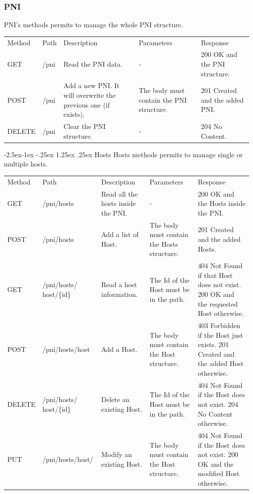 \documentclass[11pt, english]{article}
\makeatletter
\renewcommand\paragraph{\@startsection{paragraph}{4}{\z@}%
            {-2.5ex\@plus -1ex \@minus -.25ex}%
            {1.25ex \@plus .25ex}%
            {\normalfont\normalsize\bfseries}}
\makeatother
\begin{document}
\subsubsection{PNI}
PNI's methods permits to manage the whole PNI structure. \\

\begin{tabular}{ |p{2cm}|m{3cm}|p{3cm}|p{3cm}|p{4cm}| }
    \hline
    \rowcolor{black} \multicolumn{5}{|c|}{\textcolor{white}{PNI}} \\
    \hline
    \rowcolor{Gray}
    Method & Path & Description & Parameters & Response \\
    \hline
    GET   & /pni & Read the PNI data. & - & 200 OK and the PNI structure. \\
    \hline
    POST & /pni & Add a new PNI. It will overwrite the previous one (if exists). & The body must contain the PNI structure. & 201 Created and the added PNI. \\
    \hline
    DELETE & /pni & Clear the PNI structure.  & - & 204 No Content. \\
    \hline
\end{tabular}

\paragraph{Hosts}
Hosts methods permits to manage single or multiple hosts. \\

\begin{tabular}{ |p{2cm}|m{3cm}|p{3cm}|p{3cm}|p{4cm}| }
    \hline
    \rowcolor{black} \multicolumn{5}{|c|}{\textcolor{white}{Hosts}} \\
    \hline
    \rowcolor{Gray}
    Method & Path & Description & Parameters & Response \\
    \hline
    GET   & /pni/hosts & Read all the hosts inside the PNI. & - & 200 OK and the Hosts inside the PNI. \\
    \hline
    POST & /pni/hosts & Add a list of Host. & The body must contain the Hosts structure. & 201 Created and the added Hosts. \\
    \hline
    GET & /pni/hosts/ host/\{id\} & Read a host information. & The Id of the Host must be in the path. & 404 Not Found if that Host does not exist. 200 OK and the requested Host otherwise. \\
    \hline
    POST & /pni/hosts/host & Add a Host. & The body must contain the Host structure. & 403 Forbidden if the Host just exists. 201 Created and the added Host otherwise. \\
    \hline
    DELETE & /pni/hosts/ host/\{id\} & Delete an existing Host. & The Id of the Host must be in the path. & 404 Not Found if the Host does not exist. 204 No Content otherwise. \\
    \hline
    PUT & /pni/hosts/host/ & Modify an existing Host. & The body must contain the Host structure. & 404 Not Found if the Host does not exist. 200 OK and the modified Host otherwise. \\
    \hline
\end{tabular}
\end{document}
